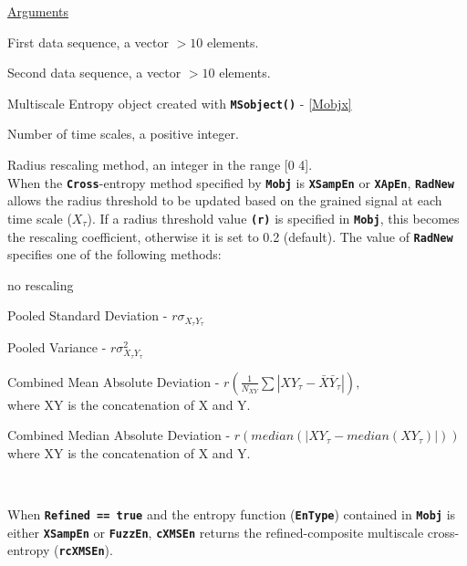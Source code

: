 \documentclass[12pt, a4paper, titlepage, openany]{book}
\begin{document}
\noindent \ul{Arguments}
\begin{description}[labelsep=1cm, labelwidth=2cm, nosep, style=multiline,leftmargin=3cm]\footnotesize
\item[\texttt{Sig1}]		First data sequence, a vector $>10$ elements.
\item[\texttt{Sig2}]		Second data sequence, a vector $>10$ elements.
\item[\texttt{Mobj}]	Multiscale Entropy object created with \texttt{\textbf{MSobject()}} - \ref{Mobjx}
\item[\texttt{Scales}]		Number of time scales, a positive integer.
\item[\texttt{RadNew}]			Radius rescaling method, an integer in the range [0 4].\\
				 When the \texttt{\textbf{Cross}}-entropy method specified by \texttt{\textbf{Mobj}} is \texttt{\textbf{XSampEn}} or \texttt{\textbf{XApEn}}, \texttt{\textbf{RadNew}} allows the radius threshold to be updated based on the grained signal at each time scale ($X_\tau$). If a radius threshold value \texttt{\textbf{(r)}} is specified in \texttt{\textbf{Mobj}},  this becomes the rescaling coefficient, otherwise it is set to 0.2 (default). The value of \texttt{\textbf{RadNew}} specifies one of the following methods:
	\begin{description}[labelsep=5em, labelwidth=4em, nosep,style=multiline,leftmargin=2cm]
		\item[0]	no rescaling
		\item[1]    Pooled Standard Deviation          - $r\sigma_{X_{\tau}Y_{\tau}}$
        \item[2]    Pooled Variance                    - $r\sigma_{X_{\tau}Y_{\tau}}^2$
        \item[3]    Combined Mean Absolute Deviation     - $r(\frac{1}{N_{XY}} \sum |XY_{\tau} - \bar{X}\bar{Y}_{\tau}|),$ \\ where XY is the concatenation of X and Y.
        \item[4]    Combined Median Absolute Deviation   - $r(median(|XY_{\tau} - median(XY_{\tau})|)) $  \\ where XY is the concatenation of X and Y.
	\end{description}
\ \\ 
\item[\texttt{Refined}]	 When \textbf{\texttt{Refined == true}} and the entropy function (\textbf{\texttt{EnType}}) contained in  \textbf{\texttt{Mobj}} is either \texttt{\textbf{XSampEn}} or \texttt{\textbf{FuzzEn}}, \texttt{\textbf{cXMSEn}} returns the refined-composite multiscale cross-entropy (\texttt{\textbf{rcXMSEn}}). \indent \cite{cMS2} \cite{cMS3}

\end{description}
\end{document}
